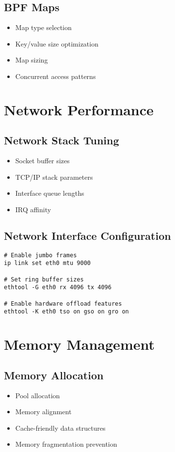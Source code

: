 \documentclass{article}
\begin{document}
\subsection{BPF Maps}
\begin{itemize}
    \item Map type selection
    \item Key/value size optimization
    \item Map sizing
    \item Concurrent access patterns
\end{itemize}

\section{Network Performance}

\subsection{Network Stack Tuning}
\begin{itemize}
    \item Socket buffer sizes
    \item TCP/IP stack parameters
    \item Interface queue lengths
    \item IRQ affinity
\end{itemize}

\subsection{Network Interface Configuration}
\begin{verbatim}
# Enable jumbo frames
ip link set eth0 mtu 9000

# Set ring buffer sizes
ethtool -G eth0 rx 4096 tx 4096

# Enable hardware offload features
ethtool -K eth0 tso on gso on gro on
\end{verbatim}

\section{Memory Management}

\subsection{Memory Allocation}
\begin{itemize}
    \item Pool allocation
    \item Memory alignment
    \item Cache-friendly data structures
    \item Memory fragmentation prevention
\end{itemize}
\end{document}

